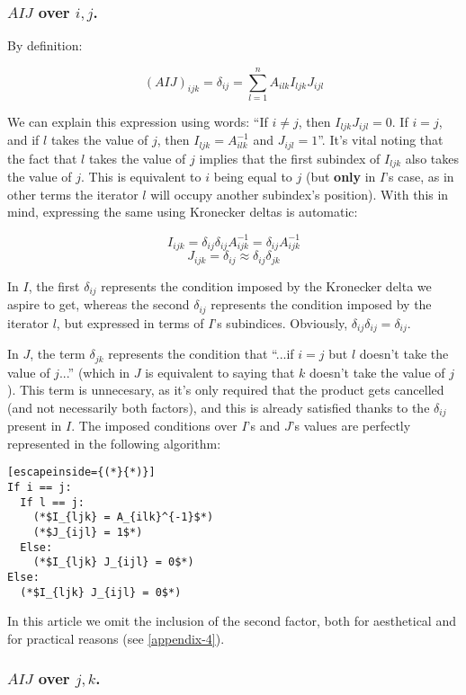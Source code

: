 \subsubsection{$AIJ$ over $i, j$.}

By definition:

$$(AIJ)_{ijk} = \delta_{ij} = \sum\limits^{n}_{l = 1} A_{ilk} I_{ljk} J_{ijl}$$

We can explain this expression using words: ``If $i \neq j$, then $I_{ljk} J_{ijl} = 0$. If $i = j$, and if $l$ takes the value of $j$, then $I_{ljk} = A^{-1}_{ilk}$ and $J_{ijl} = 1$''. It's vital noting that the fact that $l$ takes the value of $j$ implies that the first subindex of $I_{ljk}$ also takes the value of $j$. This is equivalent to $i$ being equal to $j$ (but \textbf{only} in $I$'s case, as in other terms the iterator $l$ will occupy another subindex's position). With this in mind, expressing the same using Kronecker deltas is automatic:

$$I_{ijk} = \delta_{ij} \delta_{ij} A_{ijk}^{-1} = \delta_{ij} A_{ijk}^{-1}$$
$$J_{ijk} = \delta_{ij} \approx \delta_{ij} \delta_{jk}$$

In $I$, the first $\delta_{ij}$ represents the condition imposed by the Kronecker delta we aspire to get, whereas the second $\delta_{ij}$ represents the condition imposed by the iterator $l$, but expressed in terms of $I$'s subindices. Obviously, $\delta_{ij} \delta_{ij} = \delta_{ij}$.

In $J$, the term $\delta_{jk}$ represents the condition that ``...if $i = j$ but $l$ doesn't take the value of $j$...'' (which in $J$ is equivalent to saying that $k$ doesn't take the value of $j$). This term is unnecesary, as it's only required that the product gets cancelled (and not necessarily both factors), and this is already satisfied thanks to the $\delta_{ij}$ present in $I$. The imposed conditions over $I$'s and $J$'s values are perfectly represented in the following algorithm:

\begin{lstlisting}[escapeinside={(*}{*)}]
If i == j:
  If l == j:
    (*$I_{ljk} = A_{ilk}^{-1}$*)
    (*$J_{ijl} = 1$*)
  Else:
    (*$I_{ljk} J_{ijl} = 0$*)
Else:
  (*$I_{ljk} J_{ijl} = 0$*)	
\end{lstlisting}

In this article we omit the inclusion of the second factor, both for aesthetical and for practical reasons (see \ref{appendix-4}).

\subsubsection{$AIJ$ over $j, k$.}

